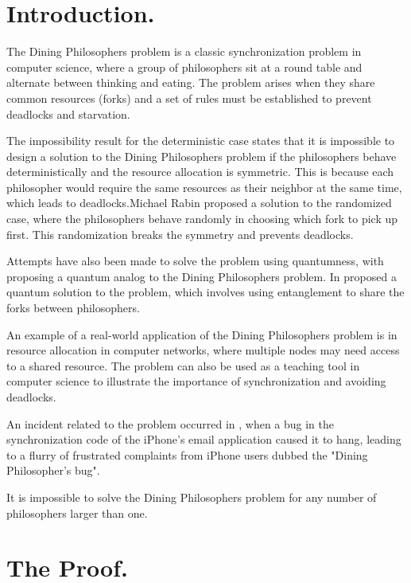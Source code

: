 \documentclass[manuscript,screen,review]{acmart}
\begin{document}
\section{Introduction.} 
The Dining Philosophers problem is a classic synchronization problem in computer science, where a group of philosophers sit at a round table and alternate between thinking and eating. The problem arises when they share common resources (forks) and a set of rules must be established to prevent deadlocks and starvation.

The impossibility result for the deterministic case states that it is impossible to design a solution to the Dining Philosophers problem if the philosophers behave deterministically and the resource allocation is symmetric. This is because each philosopher would require the same resources as their neighbor at the same time, which leads to deadlocks.Michael Rabin proposed a solution to the randomized case, where the philosophers behave randomly in choosing which fork to pick up first. This randomization breaks the symmetry and prevents deadlocks.

Attempts have also been made to solve the problem using quantumness, with   proposing a quantum analog to the Dining Philosophers problem. In  proposed a quantum solution to the problem, which involves using entanglement to share the forks between philosophers.

An example of a real-world application of the Dining Philosophers problem is in resource allocation in computer networks, where multiple nodes may need access to a shared resource. The problem can also be used as a teaching tool in computer science to illustrate the importance of synchronization and avoiding deadlocks.

An incident related to the problem occurred in , when a bug in the synchronization code of the iPhone's email application caused it to hang, leading to a flurry of frustrated complaints from iPhone users dubbed the "Dining Philosopher's bug".

\begin{theorem} 
 It is impossible to solve the Dining Philosophers problem for any number of philosophers larger than one.
\end{theorem}

\section{The Proof.}
\end{document}
